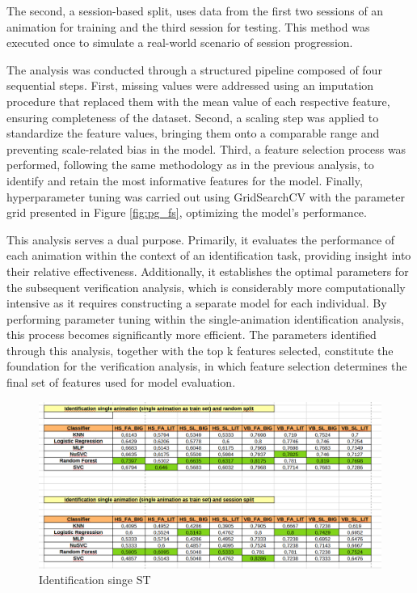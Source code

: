 \documentclass{article}
\begin{document}
The second, a session-based split, uses data from the first two sessions of an animation for training and the third session for testing. 
This method was executed once to simulate a real-world scenario of session progression.

The analysis was conducted through a structured pipeline composed of four sequential steps. 
First, missing values were addressed using an imputation procedure that replaced them with the mean value of each respective feature, ensuring completeness of the dataset. 
Second, a scaling step was applied to standardize the feature values, bringing them onto a comparable range and preventing scale-related bias in the model. 
Third, a feature selection process was performed, following the same methodology as in the previous analysis, to identify and retain the most informative features for the model. 
Finally, hyperparameter tuning was carried out using GridSearchCV with the parameter grid presented in Figure \ref{fig:pg_fs}, optimizing the model's performance.

This analysis serves a dual purpose. 
Primarily, it evaluates the performance of each animation within the context of an identification task, providing insight into their relative effectiveness. 
Additionally, it establishes the optimal parameters for the subsequent verification analysis, which is considerably more computationally intensive as it requires constructing a separate model for each individual. 
By performing parameter tuning within the single-animation identification analysis, this process becomes significantly more efficient. 
The parameters identified through this analysis, together with the top k features selected, constitute the foundation for the verification analysis, in which feature selection determines the final set of features used for model evaluation.

\begin{figure}[ht]
    \centering
    \includegraphics[width = 0.8
    \textwidth]{Images/Results/Identification_single/single_id_st.png}
    \caption{Identification singe ST}
    \label{fig:id_s_st}
\end{figure}
\end{document}
